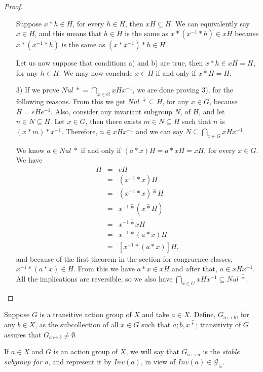 \documentclass [12pt]{book}
\begin{document}
\begin{proof}
\begin{itemize}
Suppose $x*h\in H$, for every $h\in H$, then $xH\subseteq H$. We can equivalently say $x\in H$, and this means that $h\in H$ is the same as $x*( x^{-1}*h)\in xH$ because $x*(x^{-1}*h)$ is the same as $(x*x^{-1})*h\in H$.

Let us now suppose that conditions a) and b) are true, then $x*h\in xH=H$, for any $h\in H$. We may now conclude $x\in H$ if and only if $x\bar*H=H$.

\item[3)] If we prove $Nul~\bar*=\bigcap_{x\in G}xHx^{-1}$, we are done proving 3), for the following reasons. From this we get $Nul~\bar*\subseteq H$, for any $x\in G$, because $H=eHe^{-1}$. Also, consider any invariant subgroup $N$, of $H$, and let $n\in N\subseteq H$. Let $x\in G$, then there exists $m\in N\subseteq H$ such that $n$ is $(x*m)*x^{-1}$. Therefore, $n\in xHx^{-1}$ and we can say $N\subseteq\bigcap_{x\in G}xHx^{-1}$.

We know $a\in Nul~\bar*$ if and only if $(a*x)H=a\bar*xH=xH$, for every $x\in G$. We have\begin{eqnarray}\nonumber H&=&eH\\\nonumber&=&(x^{-1}*x)H\\\nonumber&=&(x^{-1}*x)\bar*H
\\\nonumber&=&x^{-1}\bar*(x\bar*H)\\\nonumber&=&x^{-1}\bar*xH\\\nonumber &=&x^{-1}\bar*(a*x)H
\\\nonumber&=&[x^{-1}*(a*x)]H,\end{eqnarray} and because of the first theorem in the section for congruence classes, $x^{-1}*(a*x)\in H$. From this we have $a*x\in xH$ and after that, $a\in xHx^{-1}$. All the implications are reversible, so we also have $\bigcap_{x\in G}xHx^{-1}\subseteq Nul~\bar*$.\end{itemize}\end{proof}

Suppose $G$ is a transitive action group of $X$ and take $a\in X$. Define, $G_{a\mapsto b}$, for any $b\in X$, as the subcollection of all $x\in G$ such that $a;b,x\bar*$; transitivty of $G$ assures that $G_{a\mapsto b}\neq\emptyset$.

\begin{proposition}If $a\in X$ and $G$ is an action group of $X$, we will say that $G_{a\mapsto a}$ is the \textit{stable subgroup for a}, and represent it by $Inv(a)$, in view of $Inv(a)\in\mathcal{G}_{\subseteq}$.\end{proposition}
\end{document}
